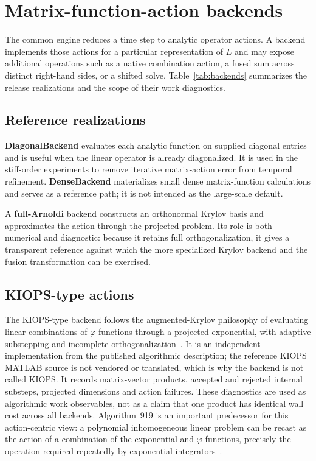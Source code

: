 \section{Matrix-function-action backends}\label{sec:backends}

The common engine reduces a time step to analytic operator actions.  A backend
implements those actions for a particular representation of $L$ and may expose
additional operations such as a native combination action, a fused sum across
distinct right-hand sides, or a shifted solve.  Table~\ref{tab:backends}
summarizes the release realizations and the scope of their work diagnostics.



\subsection{Reference realizations}

\textbf{DiagonalBackend} evaluates each analytic function on supplied diagonal
entries and is useful when the linear operator is already diagonalized.  It is
used in the stiff-order experiments to remove iterative matrix-action error from
temporal refinement.  \textbf{DenseBackend} materializes small dense
matrix-function calculations and serves as a reference path; it is not intended
as the large-scale default.

A \textbf{full-Arnoldi} backend constructs an orthonormal Krylov basis and
approximates the action through the projected problem.  Its role is both
numerical and diagnostic: because it retains full orthogonalization, it gives a
transparent reference against which the more specialized Krylov backend and the
fusion transformation can be exercised.

\subsection{KIOPS-type actions}

The KIOPS-type backend follows the augmented-Krylov philosophy of evaluating
linear combinations of $\varphi$ functions through a projected exponential,
with adaptive substepping and incomplete
orthogonalization~\cite{GaudreaultRainwaterTokman2018}.  It is an independent
implementation from the published algorithmic description; the reference KIOPS
MATLAB source is not vendored or translated, which is why the backend is not
called KIOPS.  It records matrix-vector products, accepted and rejected internal
substeps, projected dimensions and action failures.  These diagnostics are used
as algorithmic work observables, not as a claim that one product has identical
wall cost across all backends.  Algorithm~919 is an important predecessor for
this action-centric view: a polynomial inhomogeneous linear problem can be
recast as the action of a combination of the exponential and $\varphi$
functions, precisely the operation required repeatedly by exponential
integrators~\cite{NiesenWright2012}.

